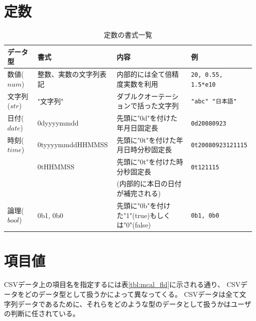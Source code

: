 \section{定数}
\begin{table}[!hb]
\begin{center}
\caption{定数の書式一覧}
{\small
  \begin{tabular}{l|l|l|l} \hline
データ型&書式&内容&例\\ \hline
数値($num$)   & 整数、実数の文字列表記& 内部的には全て倍精度実数を利用           & \verb|20, 0.55, 1.5*e10|\\
文字列($str$) & "文字列"         & ダブルクオーテーションで括った文字列          & \verb|"abc" "日本語"|\\
日付($date$)  & 0dyyyymmdd       & 先頭に"0d"を付けた年月日固定長                & \verb|0d20080923| \\
時刻($time$)  & 0tyyyymmddHHMMSS & 先頭に"0t"を付けた年月日時分秒固定長          & \verb|0t20080923121115|\\
              & 0tHHMMSS         & 先頭に"0t"を付けた時分秒固定長                & \verb|0t121115|\\
              &                  & (内部的に本日の日付が補完される)              & \\
論理($bool$)  & 0b1, 0b0         & 先頭に"0b"を付けた"1"(true)もしくは"0"(false) & \verb|0b1, 0b0| \\

\hline
  \end{tabular}
  }
  \end{center}
\end{table}


\section{項目値}
CSVデータ上の項目名を指定するには表\ref{tbl:mcal_fld}に示される通り、
CSVデータをどのデータ型として扱うかによって異なってくる。
CSVデータは全て文字列データであるために、それらをどのような型のデータとして扱うかはユーザの判断に任されている。

